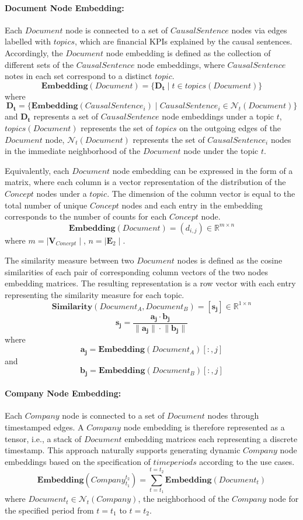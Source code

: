 \documentclass [
     12pt,         %
     a4paper,      %
     BCOR10mm,     %
     DIV14,        %
     liststotoc,   %
     bibtotoc,     %
     idxtotoc,     %
     parskip       %
     ]{scrreprt}
\begin{document}
\paragraph{Document Node Embedding:} Each $Document$ node is connected to a set of $CausalSentence$ nodes via edges labelled with $topics$, which are financial KPIs explained by the causal sentences. Accordingly, the $Document$ node embedding is defined as the collection of different sets of the $CausalSentence$ node embeddings, where $CausalSentence$ notes in each set correspond to a distinct $topic$. 
\[ \mathbf{Embedding}(Document) =  \{ \mathbf{D_t} \mid t \in topics(Document) \} \]
where
\[ \mathbf{D_t} = \{ \mathbf{Embedding}(CausalSentence_i) \mid CausalSentence_i \in \mathcal{N}_t(Document) \} \]
and $\mathbf{D_t}$ represents a set of $CausalSentence$ node embeddings under a topic $t$, $topics(Document)$ represents the set of $topics$ on the outgoing edges of the $Document$ node, $\mathcal{N}_t(Document)$ represents the set of $CausalSentence_i$ nodes in the immediate neighborhood of the $Document$ node under the topic $t$.

Equivalently, each $Document$ node embedding can be expressed in the form of a matrix, where each column is a vector representation of the distribution of the $Concept$ nodes under a $topic$. The dimension of the column vector is equal to the total number of unique $Concept$ nodes and each entry in the embedding corresponds to the number of counts for each $Concept$ node.
\[ \mathbf{Embedding}(Document) =  (d_{i,j}) \in \mathbb{R}^{m \times n} \] 
where $m=\mid \mathbf{V}_{Concept} \mid$,  $n=\mid \mathbf{E}_2 \mid$.

The similarity measure between two $Document$ nodes is defined as the cosine similarities of each pair of corresponding column vectors of the two nodes embedding matrices. The resulting representation is a row vector with each entry representing the similarity measure for each topic.
\[ \mathbf{Similarity}(Document_A, Document_B) = [ \mathbf{s_j} ] \in \mathbb{R}^{1 \times n}\]
\[  \mathbf{s_j} = \frac{\mathbf{a_j \cdot b_j} } {\mathbf{\lVert a_j \rVert \cdot \lVert b_j \rVert}} \]  
where 
\[ \mathbf{a_j} = \textbf{Embedding}(Document_A)[: , j] \]
and 
\[ \mathbf{b_j} = \textbf{Embedding}(Document_B)[: , j] \]


\paragraph{Company Node Embedding:} Each $Company$ node is connected to a set of $Document$ nodes through timestamped edges. A $Company$ node embedding is therefore represented as a tensor, i.e., a stack of $Document$ embedding matrices each representing a discrete timestamp. This approach naturally supports generating dynamic $Company$ node embeddings based on the specification of $time periods$ according to the use cases. 
\[ \mathbf{Embedding}(Company_{t_1}^{t_2}) = \sum_{t=t_1} ^{t=t_2} {\mathbf{Embedding}(Document_t)}\]  
where $Document_t \in \mathcal{N}_t(Company)$, the neighborhood of the $Company$ node for the specified period from $t=t_1$ to $t=t_2$. 
\end{document}

